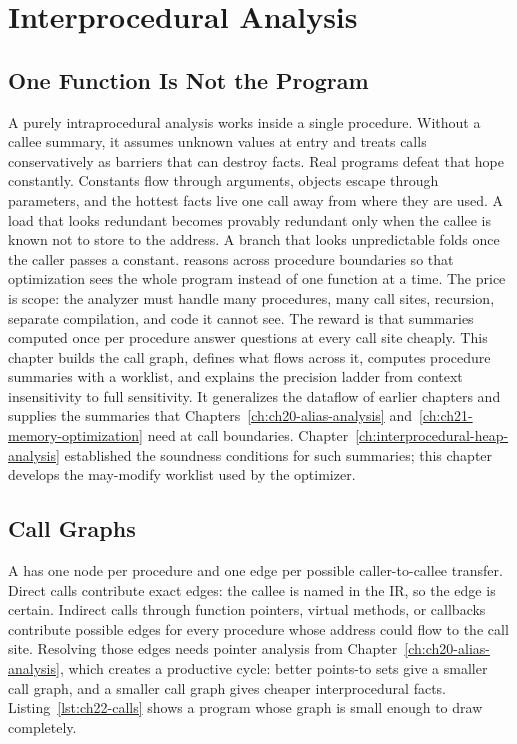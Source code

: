 \chapter{Interprocedural Analysis}
\label{ch:ch22-interprocedural-analysis}

\section{One Function Is Not the Program}
\label{sec:ch22-one-function}

A purely intraprocedural analysis works inside a single procedure.
Without a callee summary, it assumes unknown values at entry and treats calls conservatively as barriers that can destroy facts.
Real programs defeat that hope constantly.
Constants flow through arguments, objects escape through parameters, and the hottest facts live one call away from where they are used.
A load that looks redundant becomes provably redundant only when the callee is known not to store to the address.
A branch that looks unpredictable folds once the caller passes a constant.
 reasons across procedure boundaries so that optimization sees the whole program instead of one function at a time.
The price is scope: the analyzer must handle many procedures, many call sites, recursion, separate compilation, and code it cannot see.
The reward is that summaries computed once per procedure answer questions at every call site cheaply.
This chapter builds the call graph, defines what flows across it, computes procedure summaries with a worklist, and explains the precision ladder from context insensitivity to full sensitivity.
It generalizes the dataflow of earlier chapters and supplies the summaries that Chapters~\ref{ch:ch20-alias-analysis} and~\ref{ch:ch21-memory-optimization} need at call boundaries.
Chapter~\ref{ch:interprocedural-heap-analysis} established the soundness conditions for such summaries; this chapter develops the may-modify worklist used by the optimizer.

\section{Call Graphs}
\label{sec:ch22-call-graphs}

A  has one node per procedure and one edge per possible caller-to-callee transfer.
Direct calls contribute exact edges: the callee is named in the IR, so the edge is certain.
Indirect calls through function pointers, virtual methods, or callbacks contribute possible edges for every procedure whose address could flow to the call site.
Resolving those edges needs pointer analysis from Chapter~\ref{ch:ch20-alias-analysis}, which creates a productive cycle: better points-to sets give a smaller call graph, and a smaller call graph gives cheaper interprocedural facts.
Listing~\ref{lst:ch22-calls} shows a program whose graph is small enough to draw completely.

